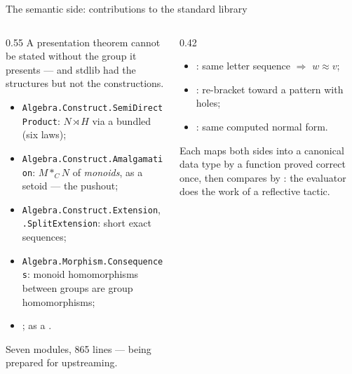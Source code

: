 \begin{frame}{The semantic side: contributions to the standard library \InPaper}
\begin{columns}[c]
\begin{column}{0.55\textwidth}
A presentation theorem cannot be stated without the group it presents --- and
stdlib had the structures but not the \alert{constructions}.
\begin{itemize}
  \setlength{\itemsep}{2pt}
  \item \texttt{Algebra.Construct.SemiDirectProduct}: $N\rtimes H$ via a
        bundled  (six laws);
  \item \texttt{Algebra.Construct.Amalgamation}: $M\ast_C N$ of
        \emph{monoids}, as a setoid --- the pushout;
  \item \texttt{Algebra.Construct.Extension}, \texttt{.SplitExtension}:
        short exact sequences;
  \item \texttt{Algebra.Morphism.Consequences}: monoid homomorphisms between
        groups are group homomorphisms;
  \item {};\;  as a .
\end{itemize}
\small Seven modules, 865 lines --- being prepared for upstreaming.
\end{column}
\begin{column}{0.42\textwidth}
\begin{keybox}[title={Solvers by evaluation, not reflection}]
\small
\begin{itemize}
  \item {}: same letter sequence $\Rightarrow$ $w\approx v$;
  \item {}: re-bracket toward a pattern with holes;
  \item {}: same computed normal form.
\end{itemize}
Each maps both sides into a canonical data type by a function proved
correct once, then compares by : the evaluator does the work of
a reflective tactic.
\end{keybox}
\end{column}
\end{columns}
\end{frame}
